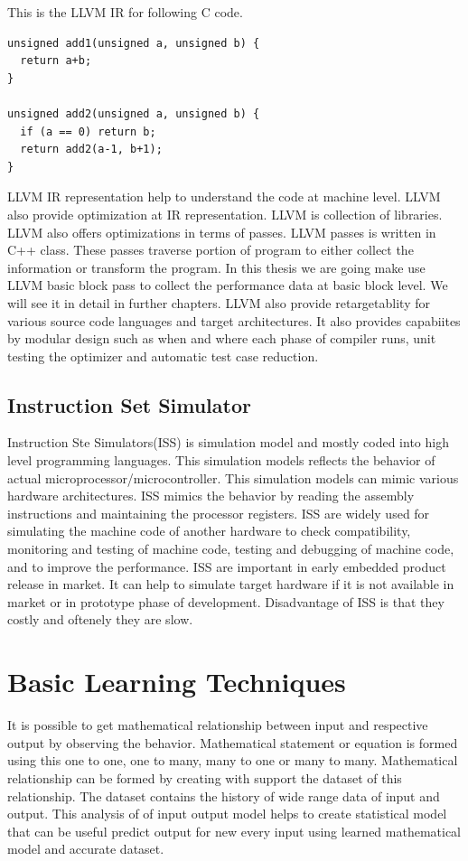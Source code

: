 This is the LLVM IR for following C code. 

\begin{lstlisting}
unsigned add1(unsigned a, unsigned b) {
  return a+b;
}

unsigned add2(unsigned a, unsigned b) {
  if (a == 0) return b;
  return add2(a-1, b+1);
}
\end{lstlisting}

LLVM IR representation help to understand the code at machine level. LLVM also provide optimization at IR representation. LLVM is collection of libraries. LLVM also offers optimizations in terms of passes. LLVM passes is written in C++ class.  These passes traverse portion of program to either collect the information or transform the program. In this thesis we are going make use LLVM basic block pass to collect the performance data at basic block level. We will see it in detail in further chapters. LLVM also provide retargetablity for various source code languages and target architectures. It also provides capabiites by modular design such as when and where each phase of compiler runs, unit testing the optimizer and automatic test case reduction. 

\subsection{Instruction Set Simulator}
Instruction Ste Simulators(ISS) is simulation model and mostly coded into high level programming languages. This simulation models reflects the behavior of actual microprocessor/microcontroller. This simulation models can mimic various hardware architectures. ISS mimics the behavior by reading the assembly instructions and maintaining the processor registers. ISS are widely used for simulating the machine code of another hardware to check compatibility, monitoring and testing of machine code, testing and debugging of machine code, and to improve the performance. ISS are important in early embedded product release in market. It can help to simulate target hardware if it is not available in market or in prototype phase of development. Disadvantage of ISS is that they costly and oftenely they are slow. 

\section{Basic Learning Techniques}
It is possible to get mathematical relationship between input and respective output by observing the behavior. Mathematical statement or equation is formed using this one to one, one to many, many to one or many to many. Mathematical relationship can be formed by creating with support the dataset of this relationship. The dataset contains the history of wide range data of input and output. This analysis of of input output model helps to create statistical model that can be useful predict output for new every input using learned mathematical model and accurate dataset. 


